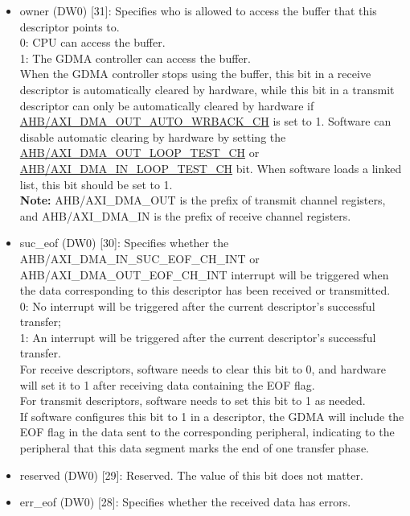 \documentclass[main\_\_EN.tex]{subfiles}
\begin{document}
\begin{itemize}
    \item owner (DW0) [31]: Specifies who is allowed to access the buffer that this descriptor points to.\\
    0: CPU can access the buffer. \\
    1: The GDMA controller can access the buffer.\\
    When the GDMA controller stops using the buffer, this bit in a receive descriptor is automatically cleared by hardware, while this bit in a transmit descriptor can only be automatically cleared by hardware if \hyperref[fielddesc:AHBDMAOUTAUTOWRBACKCHN]{AHB/AXI\_DMA\_OUT\_AUTO\_WRBACK\_CH} is set to 1. Software can disable automatic clearing by hardware by setting the \hyperref[fielddesc:AHBDMAOUTLOOPTESTCHN]{AHB/AXI\_DMA\_OUT\_LOOP\_TEST\_CH} or \hyperref[fielddesc:AHBDMAINLOOPTESTCHN]{AHB/AXI\_DMA\_IN\_LOOP\_TEST\_CH} bit. When software loads a linked list, this bit should be set to 1.
    \\{\bfseries Note:} AHB/AXI\_DMA\_OUT is the prefix of transmit channel registers, and AHB/AXI\_DMA\_IN is the prefix of receive channel registers.
    \item suc\_eof (DW0) [30]: Specifies whether the AHB/AXI\_DMA\_IN\_SUC\_EOF\_CH\_INT or AHB/AXI\_DMA\_OUT\_EOF\_CH\_INT interrupt will be triggered when the data corresponding to this descriptor has been received or transmitted.\\
    0: No interrupt will be triggered after the current descriptor's successful transfer;\\
    1: An interrupt will be triggered after the current descriptor's successful transfer.\\
    For receive descriptors, software needs to clear this bit to 0, and hardware will set it to 1 after receiving data containing the EOF flag.\\
    For transmit descriptors, software needs to set this bit to 1 as needed.\\
    If software configures this bit to 1 in a descriptor, the GDMA will include the EOF flag in the data sent to the corresponding peripheral, indicating to the peripheral that this data segment marks the end of one transfer phase.
    \item reserved (DW0) [29]: Reserved. The value of this bit does not matter.
    \item err\_eof (DW0) [28]: Specifies whether the received data has errors.\\

\end{itemize}
\end{document}

